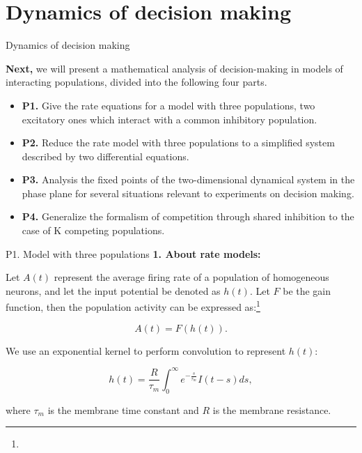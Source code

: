 \documentclass[xcolor=table,dvipsnames,svgnames,aspectratio=169,fontset=fandol]{ctexbeamer}
\begin{document}

\section{Dynamics of decision making}

\begin{frame}{Dynamics of decision making}

  \textbf{Next,} we will present a mathematical analysis of decision-making in models of interacting populations, divided into the following four parts.

    \begin{itemize}
      \item \textbf{P1.} Give the rate equations for a model with three populations, two excitatory ones which interact with a common inhibitory population. 
      \item \textbf{P2.} Reduce the rate model with three populations to a simplified system described by two differential equations.
      \item \textbf{P3.} Analysis the fixed points of the two-dimensional dynamical system in the phase plane for several situations relevant to experiments on decision making.
      \item \textbf{P4.} Generalize the formalism of competition through shared inhibition to the case of K competing populations.
    \end{itemize}

\end{frame}

\begin{frame}{P1. Model with three populations}
\textbf{1. About rate models:}

\vskip 5pt
Let $A(t)$ represent the average firing rate of a population of homogeneous neurons, and let the input potential be denoted as $h(t)$. Let $F$ be the gain function, then the population activity can be expressed as:\footnote{}   

$$A(t)=F(h(t)).$$

We use an exponential kernel to perform convolution to represent $h(t)$:

$$h(t)=\frac{R}{\tau_m}\int_{0}^{\infty}e^{-\frac{s}{\tau_m}}I(t-s)ds,$$

where $\tau_m$ is the membrane time constant and $R$ is the membrane resistance.
\end{frame}
\end{document}
